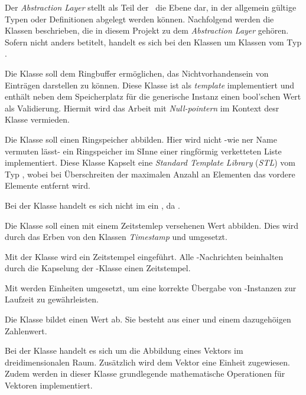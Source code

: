 
Der \textit{Abstraction Layer} stellt als Teil der \clean\ die Ebene dar, in der allgemein gültige Typen oder Definitionen abgelegt werden können. Nachfolgend werden die Klassen beschrieben, die in diesem Projekt zu dem \textit{Abstraction Layer} gehören. Sofern nicht anders betitelt, handelt es sich bei den Klassen um Klassen vom Typ \VO.



Die Klasse  soll dem Ringbuffer ermöglichen, das Nichtvorhandensein von Einträgen darstellen zu können. Diese Klasse ist als \textit{template} implementiert und enthält neben dem Speicherplatz für die generische Instanz einen bool'schen Wert als Validierung.
Hiermit wird das Arbeit mit \textit{Null-pointern} im Kontext desr Klasse  vermieden.


Die Klasse  soll einen Ringspeicher abbilden. Hier wird nicht -wie ner Name vermuten lässt- ein Ringspeicher im SInne einer ringförmig verketteten Liste implementiert. Diese Klasse Kapselt eine \textit{Standard Template Library} (\textit{STL}) vom Typ , wobei bei Überschreiten der maximalen Anzahl an Elementen das vordere Elemente entfernt wird.

Bei der Klasse  handelt es sich nicht im ein \VO, da .


Die Klasse  soll einen mit einem Zeitstemlep versehenen Wert abbilden. Dies wird durch das Erben von den Klassen \textit{Timestamp} und  umgesetzt.



Mit der Klasse  wird ein Zeitstempel eingeführt. Alle \ROS-Nachrichten beinhalten durch die Kapselung der -Klasse einen Zeitstempel.


Mit  werden Einheiten umgesetzt, um eine korrekte Übergabe von -Instanzen zur Laufzeit zu gewährleisten.


Die Klasse  bildet einen Wert ab. Sie besteht aus einer  und einem dazugehöigen Zahlenwert.


Bei der Klasse  handelt es sich um die Abbildung eines Vektors im dreidimensionalen Raum. Zusätzlich wird dem Vektor eine Einheit zugewiesen.
Zudem werden in dieser Klasse grundlegende mathematische Operationen für Vektoren implementiert.





